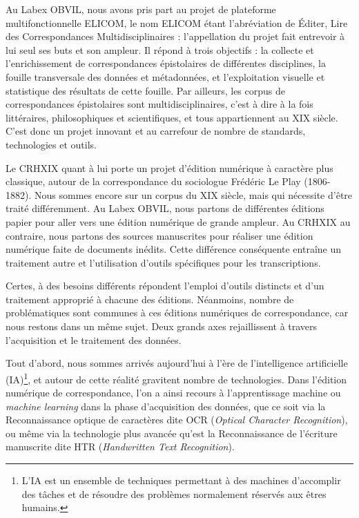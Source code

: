 Au Labex OBVIL, nous avons pris part au projet de plateforme multifonctionnelle ELICOM, le nom ELICOM étant l'abréviation de Éditer, Lire des Correspondances Multidisciplinaires : l'appellation du projet fait entrevoir à lui seul ses buts et son ampleur. Il répond à trois objectifs : la collecte et l’enrichissement de correspondances épistolaires de différentes disciplines, la fouille transversale des données et métadonnées, et l’exploitation visuelle et statistique des résultats de cette fouille. 
Par ailleurs, les corpus de correspondances épistolaires sont multidisciplinaires, c'est à dire à la fois littéraires, philosophiques et scientifiques, et tous appartiennent au XIX siècle.
C'est donc un projet innovant et au carrefour de nombre de standards, technologies et outils.

Le CRHXIX quant à lui porte un projet d'édition numérique à caractère plus classique, autour de la correspondance du sociologue Frédéric Le Play (1806-1882). Nous sommes encore sur un corpus du XIX siècle, mais qui nécessite d'être traité différemment. Au Labex OBVIL, nous partons de différentes éditions papier pour aller vers une édition numérique de grande ampleur. Au CRHXIX au contraire, nous partons des sources manuscrites pour réaliser une édition numérique faite de documents inédits. Cette différence conséquente entraîne un traitement autre et l'utilisation d'outils spécifiques pour les transcriptions.

Certes, à des besoins différents répondent l'emploi d'outils distincts et d'un traitement approprié à chacune des éditions.
Néanmoins, nombre de problématiques sont communes à ces éditions numériques de correspondance, car nous restons dans un même sujet. Deux grands axes rejaillissent à travers l'acquisition et le traitement des données.

Tout d'abord, nous sommes arrivés aujourd'hui à l'ère de l'intelligence artificielle (IA)\footnote{L’IA est un ensemble de techniques permettant à des machines d’accomplir des tâches et de résoudre des problèmes normalement réservés aux êtres humains.}, et autour de cette réalité gravitent nombre de technologies. Dans l'édition numérique de correspondance, l'on a ainsi recours à l'apprentissage machine ou \emph{machine learning} dans la phase d'acquisition des données, que ce soit via la Reconnaissance optique de caractères dite OCR (\emph{Optical Character Recognition}), ou même via la technologie plus avancée qu'est la Reconnaissance de l'écriture manuscrite dite HTR (\emph{Handwritten Text Recognition}).


